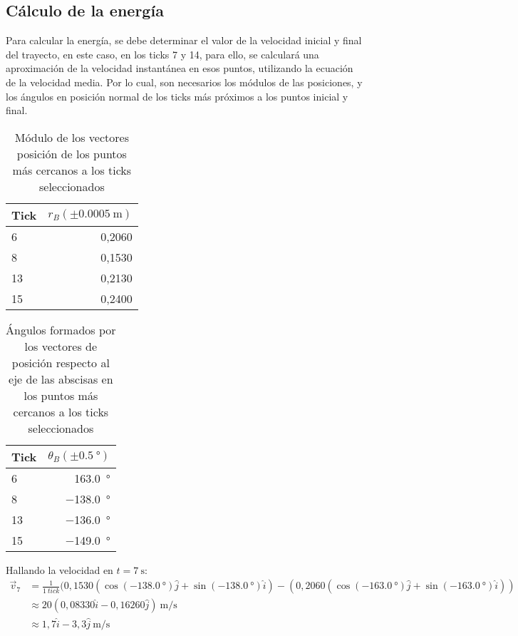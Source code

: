 \documentclass[../main.tex]{subfiles}
\begin{document}
\subsection{Cálculo de la energía}
Para calcular la energía, se debe determinar el valor de la velocidad inicial y final del trayecto, en este caso, en los ticks 7 y 14, para ello, se calculará una aproximación de la velocidad instantánea en esos puntos, utilizando la ecuación de la velocidad media.
Por lo cual, son necesarios los módulos de las posiciones, y los ángulos en posición normal de los ticks más próximos a los puntos inicial y final. 
\begin{table}[H]
  \caption{Módulo de los vectores posición de los puntos más cercanos a los ticks seleccionados}
  \label{tab:04}
  \begin{center}
    \begin{tabular}[c]{lr}
      \toprule
      \multicolumn{1}{c}{\textbf{Tick}} & 
      \multicolumn{1}{c}{$r_B (\pm \qty{0,0005}{\metre})$} \\
      \midrule
      6 & 0,2060 \\
      8 & 0,1530 \\
      13 & 0,2130 \\
      15 & 0,2400 \\
      \bottomrule
    \end{tabular}
  \end{center}
\end{table}
\begin{table}[H]
  \caption{Ángulos formados por los vectores de posición respecto al eje de las abscisas en los puntos más cercanos a los ticks seleccionados}
  \label{tab:05}
  \begin{center}
    \begin{tabular}[c]{lr}
      \toprule
      \multicolumn{1}{c}{\textbf{Tick}} & 
      \multicolumn{1}{c}{$\theta_B (\pm \qty{0,5}{\degree})$} \\
      \midrule
      6 & \qty{163,0}{\degree} \\
      8 & \qty{-138,0}{\degree} \\
      13 & \qty{-136,0}{\degree} \\
      15 & \qty{-149,0}{\degree} \\
      \bottomrule
    \end{tabular}
  \end{center}
\end{table}
Hallando la velocidad en $t = \qty{7}{\second}$:
\begin{align*}
  \vec{v}_7 &= \frac{1}{\qty{1}{tick}}
  (0,1530(\cos{(\qty{-138,0}{\degree})}\hat{j} + \sin{(\qty{-138,0}{\degree})}\hat{i}) -
  (0,2060(\cos{(\qty{-163,0}{\degree})}\hat{j} + \sin{(\qty{-163,0}{\degree})}\hat{i})) \\
  &\approx 20(0,08330 \hat{i} - 0,16260 \hat{j})\ \unit{\metre\per\second} \\
  &\approx 1,7 \hat{i} - 3,3 \hat{j}\ \unit{\metre\per\second}
\end{align*}
\end{document}
